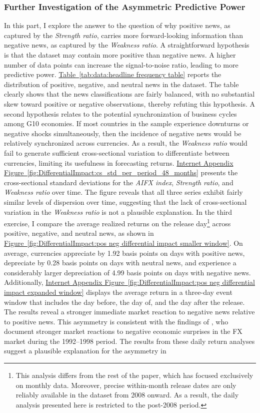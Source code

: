 \documentclass[12pt,oneside,letter]{article}
\newcommand*{\mytab}[1]{\hyperref[{#1}]{Table~\ref*{#1}}}
\newcommand*{\myfig}[1]{\hyperref[{#1}]{Figure~\ref*{#1}}}
\newcommand*{\myfigIA}[1]{\hyperref[{#1}]{Internet Appendix Figure~\ref*{#1}}}
\begin{document}
		\subsubsection{Further Investigation of the Asymmetric Predictive Power} \label{sec:Mechanism:Further Investigating of the Asymmetric Predictive Power}
		In this part, I explore the answer to the question of why positive news, as captured by the \textit{Strength ratio}, carries more forward-looking information than negative news, as captured by the \textit{Weakness ratio}. A straightforward hypothesis is that the dataset may contain more positive than negative news. A higher number of data points can increase the signal-to-noise ratio, leading to more predictive power. \mytab{tab:data:headline frequency table} reports the distribution of positive, negative, and neutral news in the dataset. The table clearly shows that the news classifications are fairly balanced, with no substantial skew toward positive or negative observations, thereby refuting this hypothesis. A second hypothesis relates to the potential synchronization of business cycles among G10 economies. If most countries in the sample experience downturns or negative shocks simultaneously, then the incidence of negative news would be relatively synchronized across currencies. As a result, the \textit{Weakness ratio} would fail to generate sufficient cross-sectional variation to differentiate between currencies, limiting its usefulness in forecasting returns. \myfigIA{fig:DifferentialImpact:cs_std_per_period_48_months} presents the cross-sectional standard deviations for the \textit{AIFX index}, \textit{Strength ratio}, and \textit{Weakness ratio} over time. The figure reveals that all three series exhibit fairly similar levels of dispersion over time, suggesting that the lack of cross-sectional variation in the \textit{Weakness ratio} is not a plausible explanation. In the third exercise, I compare the average realized returns on the release day\footnote{This analysis differs from the rest of the paper, which has focused exclusively on monthly data. Moreover, precise within-month release dates are only reliably available in the dataset from 2008 onward. As a result, the daily analysis presented here is restricted to the post-2008 period.} across positive, negative, and neutral news, as shown in \myfig{fig:DifferentialImpact:pos neg differential impact smaller window}. On average, currencies appreciate by 1.92 basis points on days with positive news, depreciate by 0.28 basis points on days with neutral news, and experience a considerably larger depreciation of 4.99 basis points on days with negative news. Additionally, \myfigIA{fig:DifferentialImpact:pos neg differential impact expanded window} displays the average return in a three-day event window that includes the day before, the day of, and the day after the release. The results reveal a stronger immediate market reaction to negative news relative to positive news. This asymmetry is consistent with the findings of \citet{ANDERSEN/ETAL:2003}, who document stronger market reactions to negative economic surprises in the FX market during the 1992–1998 period. The results from these daily return analyses suggest a plausible explanation for the asymmetry in 
\end{document}
